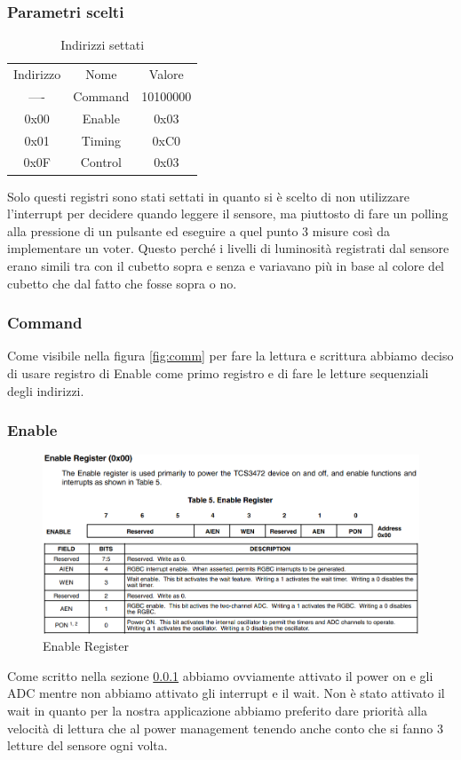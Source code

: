 \documentclass[a4paper,12pt]{report}
\begin{document}
\subsubsection{Parametri scelti}
\label{subsec:Parametri sensore}
\begin{table}[h]
    \centering
    \begin{tabular}{ccc}
        Indirizzo & Nome & Valore \\
        ---- & Command & 10100000 \\
        0x00 & Enable & 0x03 \\
        0x01 & Timing & 0xC0 \\
        0x0F & Control & 0x03
    \end{tabular}
    \caption{Indirizzi settati}
    \label{tab:my_label}
\end{table}
Solo questi registri sono stati settati in quanto si è scelto di non utilizzare l'interrupt per decidere quando leggere il sensore, ma piuttosto di fare un polling alla pressione di un pulsante ed eseguire a quel punto 3 misure così da implementare un voter. Questo perché i livelli di luminosità registrati dal sensore erano simili tra con il cubetto sopra e senza e variavano più in base al colore del cubetto che dal fatto che fosse sopra o no.

\subsubsection{Command}
Come visibile nella figura \ref{fig:comm} per fare la lettura e scrittura abbiamo deciso di usare registro di Enable come primo registro e di fare le letture sequenziali degli indirizzi.
\clearpage
\subsubsection{Enable}
\begin{figure}[h] 
    \centering
    \includegraphics[width=0.65\linewidth]{images/Immagini sensore/registro enable.png}
    \caption{Enable Register}
\end{figure}
Come scritto nella sezione \ref{subsec:Parametri sensore} abbiamo ovviamente attivato il power on e gli ADC mentre non abbiamo attivato gli interrupt e il wait.
Non è stato attivato il wait in quanto per la nostra applicazione abbiamo preferito dare priorità alla velocità di lettura che al power management tenendo anche conto che si fanno 3 letture del sensore ogni volta.
\end{document}
